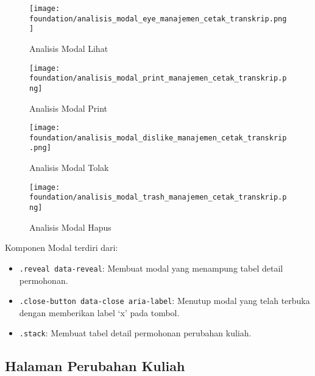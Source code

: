 \begin{figure} [H]
	\centering  
	\texttt{[image: foundation/analisis\_modal\_eye\_manajemen\_cetak\_transkrip.png]}
	\caption{Analisis Modal Lihat} 
\end{figure}
\begin{figure} [H]
	\centering  
	\texttt{[image: foundation/analisis\_modal\_print\_manajemen\_cetak\_transkrip.png]}
	\caption{Analisis Modal Print} 
\end{figure}
\begin{figure} [H]
	\centering  
	\texttt{[image: foundation/analisis\_modal\_dislike\_manajemen\_cetak\_transkrip.png]}
	\caption{Analisis Modal Tolak} 
\end{figure}
\begin{figure} [H]
	\centering  
	\texttt{[image: foundation/analisis\_modal\_trash\_manajemen\_cetak\_transkrip.png]}
	\caption{Analisis Modal Hapus} 
\end{figure}
Komponen Modal terdiri dari:
\begin{itemize}
	\item \texttt{.reveal data-reveal}: Membuat modal yang menampung tabel detail permohonan.
	\item \texttt{.close-button data-close aria-label}: Menutup modal yang telah terbuka dengan memberikan label `x' pada tombol.
	\item \texttt{.stack}:	Membuat tabel detail permohonan perubahan kuliah.
\end{itemize}


\subsection{Halaman Perubahan Kuliah}
